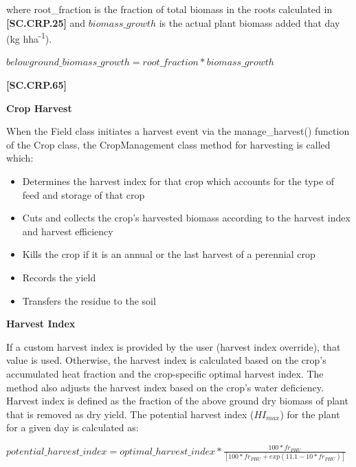 where root\_fraction is the fraction of total biomass in the roots calculated in \textbf{[SC.CRP.25]} and \(biomass\_growth\) is the actual plant biomass added that day (kg hha\textsuperscript{-1}).
   \vspace{0.2cm}

    \begin{center}
        \(belowground\_biomass\_growth=root\_fraction * biomass\_growth\) 
    \end{center}
        \vspace{0.5cm}
    
            {\raggedleft \textbf{[SC.CRP.65]}\par}
            \vspace{0.5cm}

\textbf{\large Crop Harvest}
\vspace{0.5cm}

When the Field class initiates a harvest event via the manage\_harvest() function of the Crop class, the CropManagement class method for harvesting is called which:
\begin{itemize}
    \item Determines the harvest index for that crop which accounts for the type of feed and storage of that crop
    \item Cuts and collects the crop’s harvested biomass according to the harvest index and harvest efficiency
    \item Kills the crop if it is an annual or the last harvest of a perennial crop
    \item Records the yield
    \item Transfers the residue to the soil
\end{itemize}


\textbf{Harvest Index}
\vspace{0.2cm}

If a custom harvest index is provided by the user (harvest index override), that value is used. Otherwise, the harvest index is calculated based on the crop's accumulated heat fraction and the crop-specific optimal harvest index. The method also adjusts the harvest index based on the crop's water deficiency. Harvest index is defined as the fraction of the above ground dry biomass of plant that is removed as dry yield. The potential harvest index (\(HI_{max}\)) for the plant for a given day is calculated as:
   \vspace{0.2cm}

    \begin{center}
        \(potential\_harvest\_index=optimal\_harvest\_index * \frac{ 100 * fr_{PHU}}{[100 * fr_{PHU} + exp(11.1-10 * fr_{PHU})]}\) 
    \end{center}
        \vspace{0.5cm}
    
